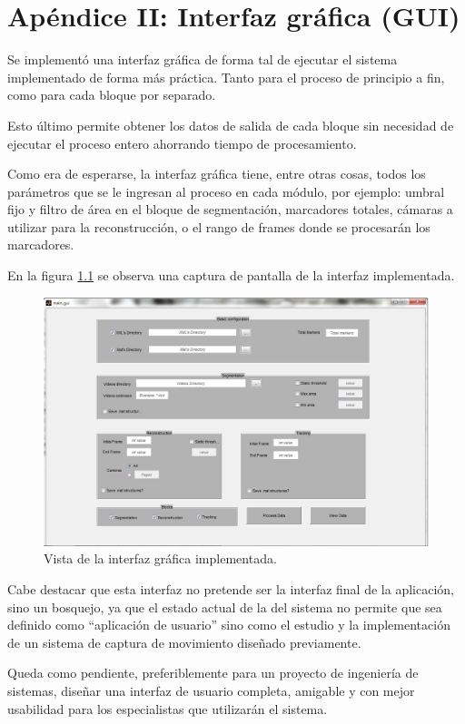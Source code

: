 \chapter{Apéndice II: Interfaz gráfica (GUI)}

Se implementó una interfaz gráfica de forma tal de ejecutar el sistema implementado de forma más práctica. Tanto para el proceso de principio a fin, como para cada bloque por separado.

Esto último permite obtener los datos de salida de cada bloque sin necesidad de ejecutar el proceso entero ahorrando tiempo de procesamiento.

Como era de esperarse, la interfaz gráfica tiene, entre otras cosas, todos los parámetros que se le ingresan al proceso en cada módulo, por ejemplo: umbral fijo y filtro de área en el bloque de segmentación, marcadores totales, cámaras a utilizar para la reconstrucción, o el rango de frames donde se procesarán los marcadores.

En la figura \ref{guiVent} se observa una captura de pantalla de la interfaz implementada.

\begin{figure}[H]
\hspace{-1cm}
\includegraphics[scale=0.54]{img/gui.png}
\caption{Vista de la interfaz gráfica implementada.}
\label{guiVent}
\end{figure}

Cabe destacar que esta interfaz no pretende ser la interfaz final de la aplicación, sino un bosquejo, ya que el estado actual de la del sistema no permite que sea definido como ``aplicación de usuario'' sino como el estudio y la implementación de un sistema de captura de movimiento diseñado previamente.

Queda como pendiente, preferiblemente para un proyecto de ingeniería de sistemas, diseñar una interfaz de usuario completa, amigable y con mejor usabilidad para los especialistas que utilizarán el sistema.